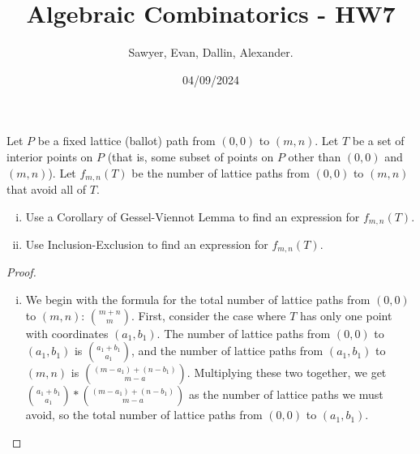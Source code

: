 \documentclass[11pt,letterpaper]{article}
\title{Algebraic Combinatorics - HW7}
\author{Sawyer, Evan, Dallin, Alexander.}
\date{04/09/2024}
\begin{document}
\maketitle
\begin{quest}[\textcolor{red}{Lattice Paths avoiding a certain set of points}]
Let $P$ be a fixed lattice (ballot) path from $(0,0)$ to $(m,n)$. Let $T$ be a set of interior points on $P$ (that is, some subset of points on $P$ other than $(0,0)$ and $(m,n)$). Let $f_{m,n}(T)$ be the number of lattice paths from $(0,0)$ to $(m,n)$ that avoid all of $T$.
\begin{enumerate}[(i)]
    \item Use a Corollary of Gessel-Viennot Lemma to find an expression for $f_{m,n}(T)$.
    \item Use Inclusion-Exclusion to find an expression for $f_{m,n}(T)$.
\end{enumerate}
\end{quest}
\begin{proof}
\begin{enumerate}[(i)]
    \item We begin with the formula for the total number of lattice paths from $(0,0)$ to $(m,n)$: ${ m+n \choose m}$. First, consider the case where $T$ has only one point with coordinates $(a_1, b_1)$. The number of lattice paths from $(0,0)$ to $(a_1, b_1)$ is ${a_1+b_1 \choose a_1}$, and the number of lattice paths from $(a_1, b_1)$ to $(m,n)$ is ${(m-a_1)+(n-b_1) \choose m-a}$. Multiplying these two together, we get ${a_1+b_1 \choose a_1}*{(m-a_1)+(n-b_1) \choose m-a}$ as the number of lattice paths we must avoid, so the total number of lattice paths from $(0,0)$ to $(a_1, b_1)$.
\end{enumerate}
\end{proof}
\end{document}
